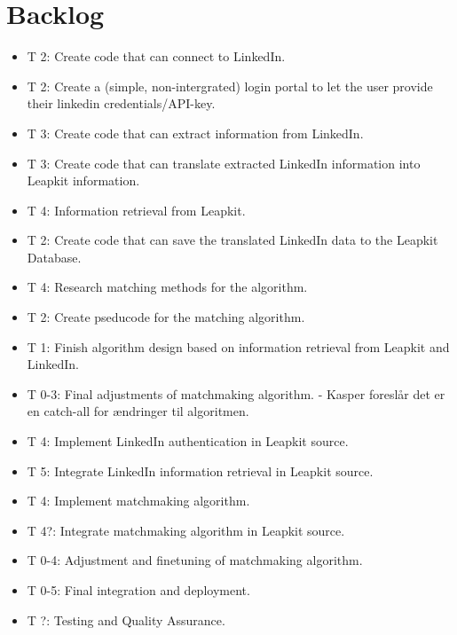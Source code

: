\documentclass{article}
\begin{document}
\section*{Backlog}

\begin{itemize}
    \item {T 2:} Create code that can connect to LinkedIn.
    \item {T 2:} Create a (simple, non-intergrated) login portal to let the user provide their linkedin credentials/API-key. 
    \item {T 3:} Create code that can extract information from LinkedIn.
    \item {T 3:} Create code that can translate extracted LinkedIn information into Leapkit information.
    \item {T 4:} Information retrieval from Leapkit.
    \item {T 2:} Create code that can save the translated LinkedIn data to the Leapkit Database.
    \item {T 4:} Research matching methods for the algorithm.
    \item {T 2:} Create pseducode for the matching algorithm.
    \item {T 1:} Finish algorithm design based on information retrieval from Leapkit and LinkedIn.
    \item {T 0-3:} Final adjustments of matchmaking algorithm. - Kasper foreslår det er en catch-all for ændringer til algoritmen.
    \item {T 4:} Implement LinkedIn authentication in Leapkit source.
    \item {T 5:} Integrate LinkedIn information retrieval in Leapkit source.
    \item {T 4:} Implement matchmaking algorithm.
    \item {T 4?:} Integrate matchmaking algorithm in Leapkit source.
    \item {T 0-4:} Adjustment and finetuning of matchmaking algorithm.
    \item {T 0-5:} Final integration and deployment.
    \item {T ?:} Testing and Quality Assurance.
\end{itemize}
\end{document}
